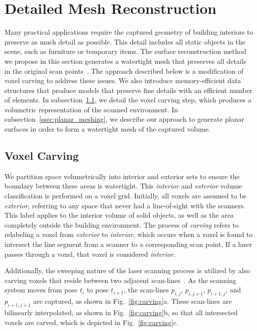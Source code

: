 \documentclass[10pt,twocolumn,twoside]{IEEEtran}
\begin{document}
\section{Detailed Mesh Reconstruction}
\label{sec:carving}

Many practical applications require the captured geometry of building interiors to preserve as much detail as possible. This detail includes all static objects in the scene, such as furniture or temporary items.  The surface reconstruction method we propose in this section generates a watertight mesh that preserves all details in the original scan points~\cite{Turner13}.  The approach described below is a modification of voxel carving to address these issues.  We also introduce memory-efficient data structures that produce models that preserve fine details with an efficient number of elements.  In subsection~\ref{ssec:voxel_carving}, we detail the voxel carving step, which produces a volumetric representation of the scanned environment.  In subsection~\ref{ssec:planar_meshing}, we describe our approach to generate planar surfaces in order to form a watertight mesh of the captured volume.

\subsection{Voxel Carving}
\label{ssec:voxel_carving}
We partition space volumetrically into interior and exterior sets to ensure the boundary between these areas is watertight.  This \textit{interior} and \textit{exterior} volume classification is performed on a voxel grid.  Initially, all voxels are assumed to be \textit{exterior}, referring to any space that never had a line-of-sight with the scanners.  This label applies to the interior volume of solid objects, as well as the area completely outside the building environment.  The process of \textit{carving} refers to relabeling a voxel from \textit{exterior} to \textit{interior}, which occurs when a voxel is found to intersect the line segment from a scanner to a corresponding scan point.  If a laser passes through a voxel, that voxel is considered \textit{interior}.

Additionally, the sweeping nature of the laser scanning process is utilized by also carving voxels that reside between two adjacent scan-lines~\cite{Turner13,Carving}.  As the scanning system moves from pose $t_i$ to pose $t_{i+1}$, the scan-lines $p_{i,j}$, $p_{i,j+1}$, $p_{i+1,j}$, and $p_{i+1,j+1}$ are captured, as shown in Fig.~\ref{fig:carving}a.  These scan-lines are bilinearly interpolated, as shown in Fig.~\ref{fig:carving}b, so that all intersected voxels are carved, which is depicted in Fig.~\ref{fig:carving}c.
\end{document}
